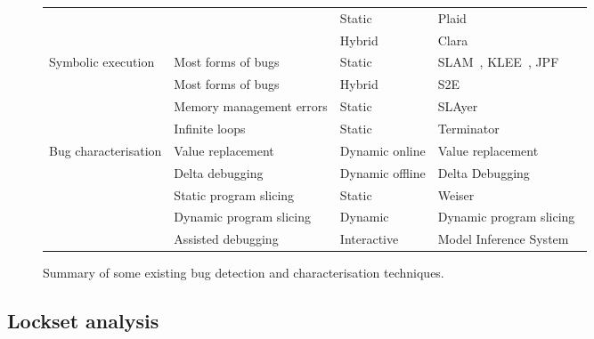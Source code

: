 \begin{sidewaysfigure}
\begin{figgure}
\begin{tabular}{l>{\RaggedRight\arraybackslash}p{5.5cm}lp{10.3cm}}
                               &                                                                             & Static  & Plaid~\cite{Sunshine2011}\\
                               &                                                                             & Hybrid  & Clara~\cite{Bodden2010}\\
    \hdashline
    Symbolic execution         & Most forms of bugs                           & Static          & SLAM~\cite{Ball2011}, KLEE~\cite{Cadar}, JPF~\cite{Havelund2000} \\
                               & Most forms of bugs                           & Hybrid          & S2E~\cite{Chipounov2011} \\
                               & Memory management errors                     & Static          & SLAyer~\cite{Berdine2011} \\
                               & Infinite loops                               & Static          & Terminator~\cite{Cook2006a} \\
    \hline
    Bug characterisation       & Value replacement                            & Dynamic online  & Value replacement~\cite{Jeffrey2009} \\
                               & Delta debugging                              & Dynamic offline & Delta Debugging~\cite{Cleve2005,Choi2002} \\
                               & Static program slicing                       & Static          & Weiser~\cite{Weiser1981} \\
                               & Dynamic program slicing                      & Dynamic         & Dynamic program slicing~\cite{Agrawal1990a} \\
                               & Assisted debugging                           & Interactive     & Model Inference System~\cite{Shapiro1982} \\
  \end{tabular}
  \caption{Summary of some existing bug detection and characterisation
    techniques. }
  \label{fig:rw:find_char}
  \end{figgure}
\end{sidewaysfigure}

\subsection{Lockset analysis}


